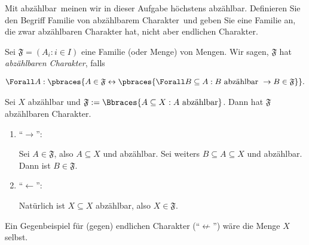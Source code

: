 
\begin{exercise}[278]

Mit \glqq abzählbar\grqq\  meinen wir in dieser Aufgabe \glqq höchstens abzählbar\grqq.
Definieren Sie den Begriff \glqq Familie von abzählbarem Charakter\grqq\ und geben
Sie eine Familie an, die zwar abzählbaren Charakter hat, nicht aber endlichen Charakter.

\end{exercise}


\begin{solution}

Sei $\mathfrak{F} = (A_i: i \in I)$ eine Familie (oder Menge) von Mengen.
Wir sagen, $\mathfrak{F}$ hat \textit{abzählbaren Charakter}, falls

\begin{align*}
  \Forall A:
  \pbraces
  {
    A \in \mathfrak{F}
    \leftrightarrow
    \pbraces
    {
      \Forall B \subseteq A:
      B ~\text{abzählbar}~
      \to
      B \in \mathfrak{F}
    }
  }.
\end{align*}


  Sei $X$ abzählbar und $\mathfrak{F} := \Bbraces{A \subseteq X: A ~\text{abzählbar}}$.
  Dann hat $\mathfrak{F}$ abzählbaren Charakter.

  \begin{enumerate}[label = \texttt{ad}]

    \item \enquote{$\to$}:

    Sei $A \in \mathfrak{F}$, also $A \subseteq X$ und abzählbar.
    Sei weiters $B \subseteq A \subseteq X$ und abzählbar.
    Dann ist $B \in \mathfrak{F}$.

    \item \enquote{$\leftarrow$}:

    Natürlich ist $X \subseteq X$ abzählbar, also $X \in \mathfrak{F}$.

  \end{enumerate}

  Ein Gegenbeispiel für (gegen) endlichen Charakter (\enquote{$\not \leftarrow$}) wäre die Menge $X$ selbst.


\end{solution}

